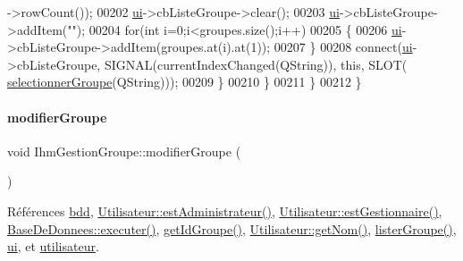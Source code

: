\begin{DoxyCode}
      ->rowCount());
00202                 \hyperlink{class_ihm_gestion_groupe_a9785ad3dadc1d2cad8558ca8b682dffd}{ui}->cbListeGroupe->clear();
00203                 \hyperlink{class_ihm_gestion_groupe_a9785ad3dadc1d2cad8558ca8b682dffd}{ui}->cbListeGroupe->addItem(\textcolor{stringliteral}{""});
00204                 \textcolor{keywordflow}{for}(\textcolor{keywordtype}{int} i=0;i<groupes.size();i++)
00205                 \{
00206                     \hyperlink{class_ihm_gestion_groupe_a9785ad3dadc1d2cad8558ca8b682dffd}{ui}->cbListeGroupe->addItem(groupes.at(i).at(1));
00207                 \}
00208                 connect(\hyperlink{class_ihm_gestion_groupe_a9785ad3dadc1d2cad8558ca8b682dffd}{ui}->cbListeGroupe, SIGNAL(currentIndexChanged(QString)), \textcolor{keyword}{this}, SLOT(
      \hyperlink{class_ihm_gestion_groupe_a322f2c8584ae8e5be7f2075b73905beb}{selectionnerGroupe}(QString)));
00209             \}
00210         \}
00211     \}
00212 \}
\end{DoxyCode}
\mbox{\label{class_ihm_gestion_groupe_a810c186bf38dab776c7167c85671b268}} 
\paragraph{\texorpdfstring{modifier\+Groupe}{modifierGroupe}}
{\footnotesize\ttfamily void Ihm\+Gestion\+Groupe\+::modifier\+Groupe (\begin{DoxyParamCaption}{ }\end{DoxyParamCaption})\hspace{0.3cm}{\ttfamily [slot]}}



Références \hyperlink{class_ihm_gestion_groupe_a4f0049a7046abe7530d7f7eaed7ed2bc}{bdd}, \hyperlink{class_utilisateur_a2c4ede0ec936ebd64d73df1e1dde3a5d}{Utilisateur\+::est\+Administrateur()}, \hyperlink{class_utilisateur_a3c86ddd77b243fd3f12ad2e85ff06759}{Utilisateur\+::est\+Gestionnaire()}, \hyperlink{class_base_de_donnees_aa8de5f8f8bb17edc43f5c0ee33712081}{Base\+De\+Donnees\+::executer()}, \hyperlink{class_ihm_gestion_groupe_a0f6dd8f645a5bf789521a25322004146}{get\+Id\+Groupe()}, \hyperlink{class_utilisateur_adfffec2519ba338497de55b61e7bc420}{Utilisateur\+::get\+Nom()}, \hyperlink{class_ihm_gestion_groupe_a7afabe81c405b35e7cfd4e760eda8c84}{lister\+Groupe()}, \hyperlink{class_ihm_gestion_groupe_a9785ad3dadc1d2cad8558ca8b682dffd}{ui}, et \hyperlink{class_ihm_gestion_groupe_a87b9d242561e8bf7765aa14a5e124db1}{utilisateur}.



